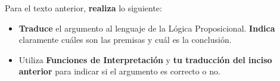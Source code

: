 \documentclass[oneside]{style}
\begin{document}
\begin{questions}[label=\protect\circled{\bfseries\arabic*}]
{        Para el texto anterior, \textbf{realiza} lo siguiente:
        \begin{itemize}
            \item \textbf{Traduce} el argumento al lenguaje de la Lógica 
            Proposicional. \textbf{Indica} claramente cuáles son las premisas y
            cuál es la conclusión. 
            
            \item Utiliza \textbf{Funciones de Interpretación} y \textbf{tu 
            traducción del inciso anterior} para indicar si el argumento es 
            correcto o no. 
        \end{itemize}
    }  
\end{questions}
\end{document}
